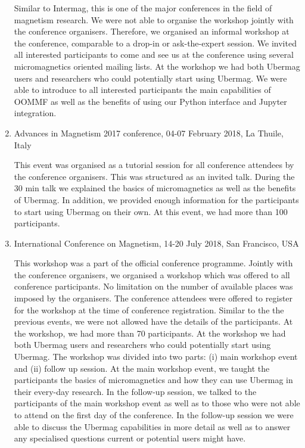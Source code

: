 \documentclass{deliverablereport}
\begin{document}
\begin{enumerate}
    Similar to Intermag, this is one of the major conferences in the
field of magnetism research. We were not able to organise the workshop
jointly with the conference organisers. Therefore, we organised an
informal workshop at the conference, comparable to a drop-in or
ask-the-expert session. We invited all
interested participants to come and see us at the conference using
several micromagnetics oriented mailing lists. At the workshop we had
both Ubermag users and researchers who could potentially start using
Ubermag. We were able to introduce to all interested participants the
main capabilities of OOMMF as well as the benefits of using our Python
interface and Jupyter integration.

\item Advances in Magnetism 2017 conference, 04-07 February 2018, La Thuile,
Italy

    This event was organised as a tutorial session for all conference
attendees by the conference organisers. This was structured as an
invited talk. During the 30 min talk we explained the basics of
micromagnetics as well as the benefits of Ubermag. In addition, we
provided enough information for the participants to start using
Ubermag on their own. At this event, we had more than 100
participants.

\item International Conference on Magnetism, 14-20 July 2018, San
Francisco, USA

    This workshop was a part of the official conference
programme. Jointly with the conference organisers, we organised a
workshop which was offered to all conference participants. No
limitation on the number of available places was imposed by the
organisers. The conference attendees were offered to register for the
workshop at the time of conference registration. Similar to the the
previous events, we were not allowed have the details of the
participants. At the workshop, we had more than 70 participants. At
the workshop we had both Ubermag users and researchers who could
potentially start using Ubermag. The workshop was divided into two
parts: (i) main workshop event and (ii) follow up session. At the main
workshop event, we taught the participants the basics of
micromagnetics and how they can use Ubermag in their every-day
research. In the follow-up session, we talked to the participants of
the main workshop event as well as to those who were not able to
attend on the first day of the conference. In the follow-up session we
were able to discuss the Ubermag capabilities in more detail as well
as to answer any specialised questions current or potential users
might have.


\end{enumerate}
\end{document}
